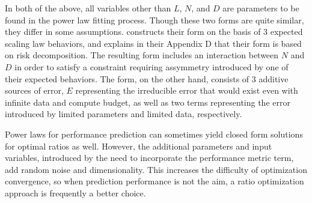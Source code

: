 In both of the above, all variables other than $L$, $N$, and $D$ are parameters to be found in the power law fitting process. Though these two forms are quite similar, they differ in some assumptions. \citet{kaplan2020scaling} constructs their form on the basis of 3 expected scaling law behaviors, and \citet{hoffmann2022training} explains in their Appendix D that their form is based on risk decomposition. The resulting \citet{kaplan2020scaling} form includes an interaction between $N$ and $D$ in order to satisfy a constraint requiring assymmetry introduced by one of their expected behaviors. The \citet{hoffmann2022training} form, on the other hand, consists of 3 additive sources of error, $E$ representing the irreducible error that would exist even with infinite data and compute budget, as well as two terms representing the error introduced by limited parameters and limited data, respectively.

Power laws for performance prediction can sometimes yield closed form solutions for optimal ratios as well. However, the additional parameters and input variables, introduced by the need to incorporate the performance metric term, add random noise and dimensionality. This increases the difficulty of optimization convergence, so when prediction performance is not the aim, a ratio optimization approach is frequently a better choice.



